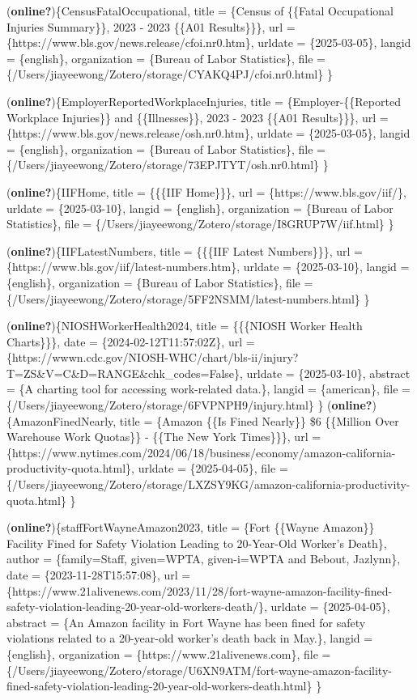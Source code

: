 \documentclass[
  letterpaper,
  DIV=11,
  numbers=noendperiod]{scrreprt}
\begin{document}
(\textbf{online?})\{CensusFatalOccupational, title = \{Census of
\{\{Fatal Occupational Injuries Summary\}\}, 2023 - 2023 \{\{A01
Results\}\}\}, url = \{https://www.bls.gov/news.release/cfoi.nr0.htm\},
urldate = \{2025-03-05\}, langid = \{english\}, organization = \{Bureau
of Labor Statistics\}, file =
\{/Users/jiayeewong/Zotero/storage/CYAKQ4PJ/cfoi.nr0.html\} \}

(\textbf{online?})\{EmployerReportedWorkplaceInjuries, title =
\{Employer-\{\{Reported Workplace Injuries\}\} and \{\{Illnesses\}\},
2023 - 2023 \{\{A01 Results\}\}\}, url =
\{https://www.bls.gov/news.release/osh.nr0.htm\}, urldate =
\{2025-03-05\}, langid = \{english\}, organization = \{Bureau of Labor
Statistics\}, file =
\{/Users/jiayeewong/Zotero/storage/73EPJTYT/osh.nr0.html\} \}

(\textbf{online?})\{IIFHome, title = \{\{\{IIF Home\}\}\}, url =
\{https://www.bls.gov/iif/\}, urldate = \{2025-03-10\}, langid =
\{english\}, organization = \{Bureau of Labor Statistics\}, file =
\{/Users/jiayeewong/Zotero/storage/I8GRUP7W/iif.html\} \}

(\textbf{online?})\{IIFLatestNumbers, title = \{\{\{IIF Latest
Numbers\}\}\}, url = \{https://www.bls.gov/iif/latest-numbers.htm\},
urldate = \{2025-03-10\}, langid = \{english\}, organization = \{Bureau
of Labor Statistics\}, file =
\{/Users/jiayeewong/Zotero/storage/5FF2NSMM/latest-numbers.html\} \}

(\textbf{online?})\{NIOSHWorkerHealth2024, title = \{\{\{NIOSH Worker
Health Charts\}\}\}, date = \{2024-02-12T11:57:02Z\}, url =
\{https://wwwn.cdc.gov/NIOSH-WHC/chart/bls-ii/injury?T=ZS\&V=C\&D=RANGE\&chk\_codes=False\},
urldate = \{2025-03-10\}, abstract = \{A charting tool for accessing
work-related data.\}, langid = \{american\}, file =
\{/Users/jiayeewong/Zotero/storage/6FVPNPH9/injury.html\} \}
(\textbf{online?})\{AmazonFinedNearly, title = \{Amazon \{\{Is Fined
Nearly\}\} \$6 \{\{Million Over Warehouse Work Quotas\}\} - \{\{The New
York Times\}\}\}, url =
\{https://www.nytimes.com/2024/06/18/business/economy/amazon-california-productivity-quota.html\},
urldate = \{2025-04-05\}, file =
\{/Users/jiayeewong/Zotero/storage/LXZSY9KG/amazon-california-productivity-quota.html\}
\}

(\textbf{online?})\{staffFortWayneAmazon2023, title = \{Fort \{\{Wayne
Amazon\}\} Facility Fined for Safety Violation Leading to 20-Year-Old
Worker's Death\}, author = \{family=Staff, given=WPTA, given-i=WPTA and
Bebout, Jazlynn\}, date = \{2023-11-28T15:57:08\}, url =
\{https://www.21alivenews.com/2023/11/28/fort-wayne-amazon-facility-fined-safety-violation-leading-20-year-old-workers-death/\},
urldate = \{2025-04-05\}, abstract = \{An Amazon facility in Fort Wayne
has been fined for safety violations related to a 20-year-old worker's
death back in May.\}, langid = \{english\}, organization =
\{https://www.21alivenews.com\}, file =
\{/Users/jiayeewong/Zotero/storage/U6XN9ATM/fort-wayne-amazon-facility-fined-safety-violation-leading-20-year-old-workers-death.html\}
\}
\end{document}

